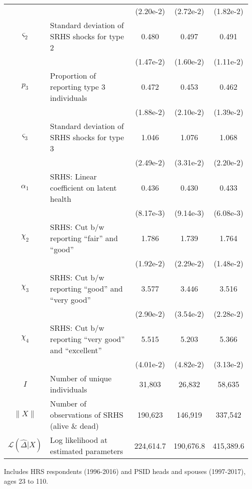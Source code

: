 \begin{table}
\begin{center}
{\begin{tabular}{clccc}
\rule{0pt}{2.2ex} & & (2.20e-2) & (2.72e-2) & (1.82e-2) \\
\rule{0pt}{2.2ex}$\varsigma_2$ & Standard deviation of SRHS shocks for type 2 & 0.480 & 0.497 & 0.491 \\
\rule{0pt}{2.2ex} & & (1.47e-2) & (1.60e-2) & (1.11e-2) \\
\rule{0pt}{2.2ex}$p_3$ & Proportion of reporting type 3 individuals & 0.472 & 0.453 & 0.462 \\
\rule{0pt}{2.2ex} & & (1.88e-2) & (2.10e-2) & (1.39e-2) \\
\rule{0pt}{2.2ex}$\varsigma_3$ & Standard deviation of SRHS shocks for type 3 & 1.046 & 1.076 & 1.068 \\
\rule{0pt}{2.2ex} & & (2.49e-2) & (3.31e-2) & (2.20e-2) \\
\hline
\rule{0pt}{2.2ex}$\alpha_1$ & SRHS: Linear coefficient on latent health & 0.436 & 0.430 & 0.433 \\
\rule{0pt}{2.2ex} & & (8.17e-3) & (9.14e-3) & (6.08e-3) \\
\rule{0pt}{2.2ex}$\chi_2$ & SRHS: Cut b/w reporting ``fair'' and ``good'' & 1.786 & 1.739 & 1.764 \\
\rule{0pt}{2.2ex} & & (1.92e-2) & (2.29e-2) & (1.48e-2) \\
\rule{0pt}{2.2ex}$\chi_3$ & SRHS: Cut b/w reporting ``good'' and ``very good'' & 3.577 & 3.446 & 3.516 \\
\rule{0pt}{2.2ex} & & (2.90e-2) & (3.54e-2) & (2.28e-2) \\
\rule{0pt}{2.2ex}$\chi_4$ & SRHS: Cut b/w reporting ``very good'' and ``excellent'' & 5.515 & 5.203 & 5.366 \\
\rule{0pt}{2.2ex} & & (4.01e-2) & (4.82e-2) & (3.13e-2) \\
\hline
\rule{0pt}{2.2ex}$I$ & Number of unique individuals & 31,803 & 26,832 & 58,635\\
\rule{0pt}{2.2ex}$\lVert X \rVert$ & Number of observations of SRHS (alive \& dead) & 190,623 & 146,919 & 337,542\\
\rule{0pt}{2.2ex}$\mathcal{L}(\widehat{\Delta} | X)$ & Log likelihood at estimated parameters & 224,614.7 & 190,676.8 & 415,389.6\\
\hline\hline
\end{tabular}
 } 
\usebox{\TwoStudyTableBox}  
\settowidth\TableWidth{\usebox{\TwoStudyTableBox}} %
\vspace{0.0cm} \parbox{\TableWidth}{
Includes HRS respondents (1996-2016) and PSID heads and spouses (1997-2017), ages 23 to 110.\\
}
\end{center}
\end{table}
